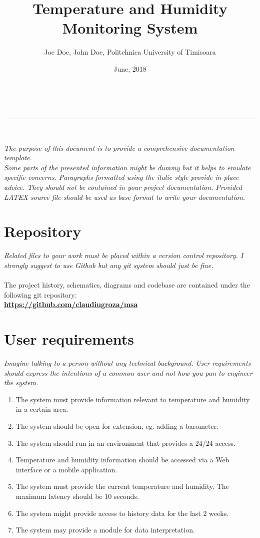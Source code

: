\documentclass[a4paper,11pt]{article}
\makeatletter
\newcommand{\divider}{\rule{\linewidth}{0.5pt}}
\renewcommand{\maketitle}{
\begin{center}
\vspace{2ex}
{\huge \textsc{\@title}}
\vspace{1ex}
\\
\divider\\
\@author \hfill \@date
\vspace{4ex}
\end{center}
}
\makeatother
\begin{document}
\title{Temperature and Humidity Monitoring System}

\author{Joe Doe, John Doe, Politehnica University of Timisoara}

\date{June, 2018}

\maketitle


\textit{The purpose of this document is to provide a comprehensive documentation template.\\
Some parts of the presented information might be dummy but it helps to emulate specific concerns.
Paragraphs formatted using the italic style provide in-place advice. They should not be contained in your project documentation.
Provided LATEX source file should be used as base format to write your documentation.
}

\section{Repository}
\textit{Related files to your work must be placed within a version control repository. I strongly suggest to use Github but any git system should just be fine.}\\\\
The project history, schematics, diagrams and codebase are contained under the following git repository:\\
\textbf{\url{https://github.com/claudiugroza/msa}}

\section{User requirements}
\textit{Imagine talking to a person without any technical background. User requirements should express the intentions of a common user and not how you pan to engineer the system.}

\begin{enumerate}  
\item The system must provide information relevant to temperature and humidity in a certain area.
\item The system should be open for extension, eg. adding a barometer.
\item The system should run in an environment that provides a 24/24 access.
\item Temperature and humidity information should be accessed via a Web interface or a mobile application.
\item The system must provide the current temperature and humidity. The maximum
latency should be 10 seconds.
\item The system might provide access to history data for the last 2 weeks.
\item The system may provide a module for data interpretation.
\end{enumerate}
\end{document}
